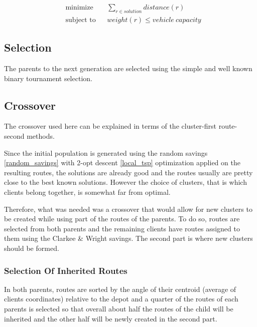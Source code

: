 \documentclass{article} %
\begin{document}
{\begin{equation*}
\begin{aligned}
& \text{minimize}
& & \sum\limits_{r \in solution} distance(r) \\
& \text{subject to}
& & weight(r) \leq vehicle\ capacity
\end{aligned}
\end{equation*}

\subsection{Selection}

The parents to the next generation are selected using the simple and well known binary tournament selection.


\subsection{Crossover}

The crossover used here can be explained in terms of the cluster-first route-second methods.\newline

Since the initial population is generated using the random savings \ref{random_savings} with 2-opt descent \ref{local_tsp} optimization applied on the resulting routes, the solutions are already good and the routes usually are pretty close to the best known solutions. However the choice of clusters, that is which clients belong together, is somewhat far from optimal.\newline

Therefore, what was needed was a crossover that would allow for new clusters to be created while using part of the routes of the parents. To do so, routes are selected from both parents and the remaining clients have routes assigned to them using the Clarkee \& Wright savings. The second part is where new clusters should be formed.


\subsubsection{Selection Of Inherited Routes}

In both parents, routes are sorted by the angle of their centroid (average of clients coordinates) relative to the depot and a quarter of the routes of each parents is selected so that overall about half the routes of the child will be inherited and the other half will be newly created in the second part.\newline

}
\end{document}
